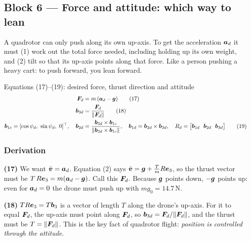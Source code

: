 \subsection{Block 6 --- Force and attitude: which way to lean}
\label{sec:m1b6}

\begin{idea}
A quadrotor can only push along its own up-axis. To get the acceleration $\bm{a}_d$ it must (1) work out the total force
needed, including holding up its own weight, and (2) tilt so that its up-axis points along that force. Like a person
pushing a heavy cart: to push forward, you lean forward.
\end{idea}

\begin{eqbox}{Equations (17)--(19): desired force, thrust direction and attitude}
\begin{align}
  \bm{F}_d &= m\,(\bm{a}_d-\bm{g}) \tag{17}\label{eq:17}\\
  \bm{b}_{3d} &= \frac{\bm{F}_d}{\|\bm{F}_d\|} \tag{18}\label{eq:18}\\
  \bm{b}_{1c}=[\cos\psi_d,\ \sin\psi_d,\ 0]^\top,\quad
  \bm{b}_{2d}&=\frac{\bm{b}_{3d}\times\bm{b}_{1c}}{\|\bm{b}_{3d}\times\bm{b}_{1c}\|},\quad
  \bm{b}_{1d}=\bm{b}_{2d}\times\bm{b}_{3d},\quad
  R_d=\big[\bm{b}_{1d}\ \ \bm{b}_{2d}\ \ \bm{b}_{3d}\big] \tag{19}\label{eq:19}
\end{align}
\end{eqbox}

\subsubsection*{Derivation}
\textbf{(17)} We want $\dot{\bm{v}}=\bm{a}_d$. Equation (2) says $\dot{\bm{v}}=\bm{g}+\frac{T}{m}R\bm{e}_3$, so the thrust vector must be
$T\,R\bm{e}_3=m(\bm{a}_d-\bm{g})$. Call this $\bm{F}_d$. Because $\bm{g}$ points down, $-\bm{g}$ points up: even for $\bm{a}_d=0$ the drone
must push up with $mg_0=14.7$\,N.

\textbf{(18)} $T R\bm{e}_3=T\bm{b}_3$ is a vector of length $T$ along the drone's up-axis. For it to equal $\bm{F}_d$, the up-axis
must point along $\bm{F}_d$, so $\bm{b}_{3d}=\bm{F}_d/\|\bm{F}_d\|$, and the thrust must be $T=\|\bm{F}_d\|$.
This is the key fact of quadrotor flight: \emph{position is controlled through the attitude}.

